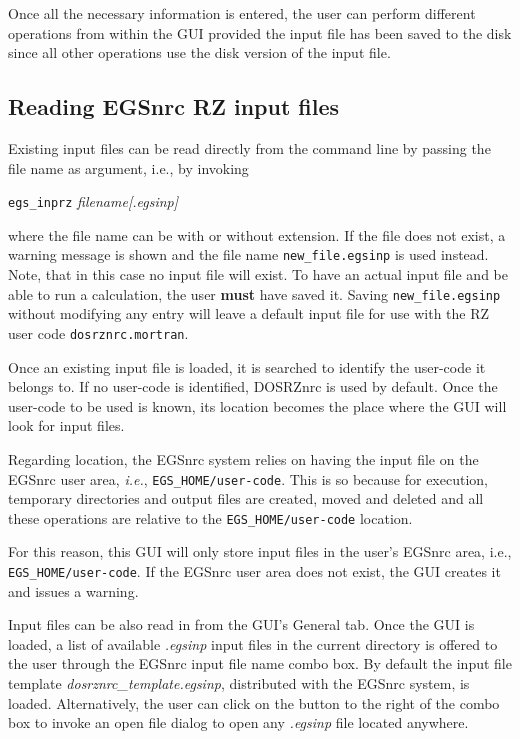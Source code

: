 \documentclass[12pt,twoside]{article}   %
\newcommand{\ie}{{\em i.e.}}
\begin{document}
Once all the necessary information is entered, the user can perform different operations
from within the GUI provided the input file has been saved to the disk since all other
operations use the disk version of the input file.


\subsection{Reading EGSnrc RZ input files}
\label{reading}

Existing input files can be read directly from the command line by passing the file name as
argument, i.e., by invoking

        {\tt egs\_inprz} {\em filename[.egsinp]}

\noindent
where the file name can be with or without extension. If the file does not exist, a warning
message is shown and the file name {\tt new\_file.egsinp} is used instead. Note, that in this
case no input file will exist. To have an actual input file and be able to run a calculation,
the user {\bf must} have saved it. Saving {\tt new\_file.egsinp} without modifying any entry
will leave a default input file for use with the RZ user code {\tt dosrznrc.mortran}.

Once an existing input file is loaded, it is
searched to identify the user-code it belongs to. If no user-code is identified,
DOSRZnrc is used by default. Once the user-code to be used is known, its location
becomes the place where the GUI will look for input files.

Regarding location, the EGSnrc system relies on having the input file on the EGSnrc
user area, \ie, {\tt EGS\_HOME/user-code}. This is so because for execution,
temporary directories and output files are created, moved and deleted and all these
operations are relative to the {\tt EGS\_HOME/user-code} location.

For this reason, this GUI will only store input files in the user's EGSnrc
area, i.e., {\tt EGS\_HOME/user-code}. If the EGSnrc user area does not exist,
the GUI creates it and issues a warning.

Input files can be also read in from the GUI's General tab. Once the GUI is loaded,
a list of available {\em *.egsinp} input files in the current directory is offered
to the user through the EGSnrc input file name combo box. By default the input file
template {\em dosrznrc\_template.egsinp}, distributed with the EGSnrc system, is loaded.
Alternatively, the user can click on the button to the right of the combo box to
invoke an open file dialog to open any {\em *.egsinp} file located anywhere.
\end{document}
